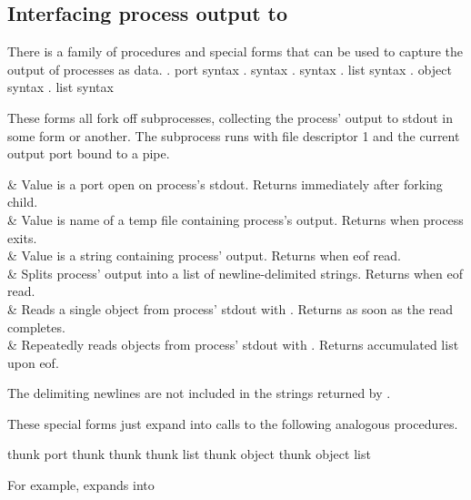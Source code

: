 \subsection{Interfacing process output to {\Scheme}}
\label{sec:io-interface}
There is a family of procedures and special forms that can be used
to capture the output of processes as {\Scheme} data.
%
   {. } {port} {syntax}
    {. } {\str} {syntax}
  {. } {\str} {syntax}
 {. } {{\str} list} {syntax}
    {. } {object} {syntax}
   {. } {list}   {syntax}
\begin{desc}
These forms all fork off subprocesses, collecting the process' output
to stdout in some form or another. 
The subprocess runs with file descriptor 1 and the current output port
bound to a pipe.
\begin{desctable}{0.7\linewidth}
   & Value is a port open on process's stdout. 
                  Returns immediately after forking child. \\
   & Value is name of a temp file containing process's output.
                  Returns when process exits. \\
 & Value is a string containing process' output.
                  Returns when eof read. \\
& Splits process' output into a list of 
                  newline-delimited strings. Returns when eof read. \\
   & Reads a single object from process' stdout with .
                  Returns as soon as the read completes. \\
  & Repeatedly reads objects from process' stdout with .
                  Returns accumulated list upon eof.
\end{desctable}
The delimiting newlines are not included in the strings returned by
.

These special forms just expand into calls to the following analogous
procedures.
\end{desc}

    {thunk} {port}
    {thunk} {\str}
  {thunk} {\str}
 {thunk} {{\str} list}
    {thunk} {object}
   {thunk} {object list}
\begin{desc}
For example,  expands into
\end{desc}

